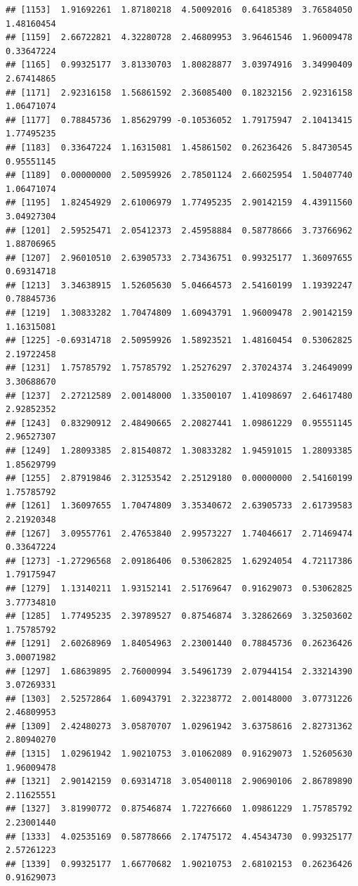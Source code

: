 \documentclass[
]{article}
\begin{document}
\begin{verbatim}
## [1153]  1.91692261  1.87180218  4.50092016  0.64185389  3.76584050  1.48160454
## [1159]  2.66722821  4.32280728  2.46809953  3.96461546  1.96009478  0.33647224
## [1165]  0.99325177  3.81330703  1.80828877  3.03974916  3.34990409  2.67414865
## [1171]  2.92316158  1.56861592  2.36085400  0.18232156  2.92316158  1.06471074
## [1177]  0.78845736  1.85629799 -0.10536052  1.79175947  2.10413415  1.77495235
## [1183]  0.33647224  1.16315081  1.45861502  0.26236426  5.84730545  0.95551145
## [1189]  0.00000000  2.50959926  2.78501124  2.66025954  1.50407740  1.06471074
## [1195]  1.82454929  2.61006979  1.77495235  2.90142159  4.43911560  3.04927304
## [1201]  2.59525471  2.05412373  2.45958884  0.58778666  3.73766962  1.88706965
## [1207]  2.96010510  2.63905733  2.73436751  0.99325177  1.36097655  0.69314718
## [1213]  3.34638915  1.52605630  5.04664573  2.54160199  1.19392247  0.78845736
## [1219]  1.30833282  1.70474809  1.60943791  1.96009478  2.90142159  1.16315081
## [1225] -0.69314718  2.50959926  1.58923521  1.48160454  0.53062825  2.19722458
## [1231]  1.75785792  1.75785792  1.25276297  2.37024374  3.24649099  3.30688670
## [1237]  2.27212589  2.00148000  1.33500107  1.41098697  2.64617480  2.92852352
## [1243]  0.83290912  2.48490665  2.20827441  1.09861229  0.95551145  2.96527307
## [1249]  1.28093385  2.81540872  1.30833282  1.94591015  1.28093385  1.85629799
## [1255]  2.87919846  2.31253542  2.25129180  0.00000000  2.54160199  1.75785792
## [1261]  1.36097655  1.70474809  3.35340672  2.63905733  2.61739583  2.21920348
## [1267]  3.09557761  2.47653840  2.99573227  1.74046617  2.71469474  0.33647224
## [1273] -1.27296568  2.09186406  0.53062825  1.62924054  4.72117386  1.79175947
## [1279]  1.13140211  1.93152141  2.51769647  0.91629073  0.53062825  3.77734810
## [1285]  1.77495235  2.39789527  0.87546874  3.32862669  3.32503602  1.75785792
## [1291]  2.60268969  1.84054963  2.23001440  0.78845736  0.26236426  3.00071982
## [1297]  1.68639895  2.76000994  3.54961739  2.07944154  2.33214390  3.07269331
## [1303]  2.52572864  1.60943791  2.32238772  2.00148000  3.07731226  2.46809953
## [1309]  2.42480273  3.05870707  1.02961942  3.63758616  2.82731362  2.80940270
## [1315]  1.02961942  1.90210753  3.01062089  0.91629073  1.52605630  1.96009478
## [1321]  2.90142159  0.69314718  3.05400118  2.90690106  2.86789890  2.11625551
## [1327]  3.81990772  0.87546874  1.72276660  1.09861229  1.75785792  2.23001440
## [1333]  4.02535169  0.58778666  2.17475172  4.45434730  0.99325177  2.57261223
## [1339]  0.99325177  1.66770682  1.90210753  2.68102153  0.26236426  0.91629073

\end{verbatim}
\end{document}
